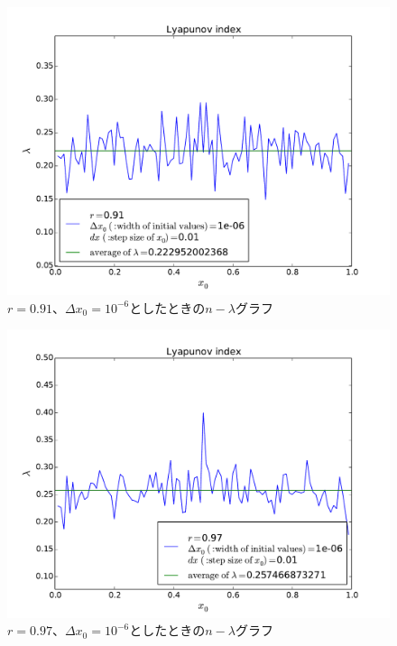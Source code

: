 \documentclass{jsarticle}
\begin{document}
\begin{enumerate}
\begin{enumerate}
                \begin{figure}[H]   
                    \begin{center}
                        \includegraphics[width=12.5cm]{figure_6.pdf}
                        \caption{$r=0.91$、$\Delta x_{0}=10^{-6}$としたときの$n - \lambda$グラフ}
                        \label{fig:f3}
                    \end{center}
                \end{figure}
                
                \begin{figure}[H]   
                    \begin{center}
                        \includegraphics[width=12.5cm]{figure_7.pdf}
                        \caption{$r=0.97$、$\Delta x_{0}=10^{-6}$としたときの$n - \lambda$グラフ}
                        \label{fig:f4}
                    \end{center}
                \end{figure}
                

\end{enumerate}
\end{enumerate}
\end{document}
